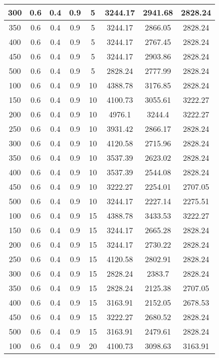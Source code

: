 \documentclass[a4paper, 12pt]{extreport}
\begin{document}
\begin{itemize}
\begin{longtable}{|c|c|c|c|c|c|c|c|}
			300 & 0.6 & 0.4 & 0.9 & 5 & 3244.17 & 2941.68 & 2828.24 \\\hline
			350 & 0.6 & 0.4 & 0.9 & 5 & 3244.17 & 2866.05 & 2828.24 \\\hline
			400 & 0.6 & 0.4 & 0.9 & 5 & 3244.17 & 2767.45 & 2828.24 \\\hline
			450 & 0.6 & 0.4 & 0.9 & 5 & 3244.17 & 2903.86 & 2828.24 \\\hline
			500 & 0.6 & 0.4 & 0.9 & 5 & 2828.24 & 2777.99 & 2828.24 \\\hline
			100 & 0.6 & 0.4 & 0.9 & 10 & 4388.78 & 3176.85 & 2828.24 \\\hline
			150 & 0.6 & 0.4 & 0.9 & 10 & 4100.73 & 3055.61 & 3222.27 \\\hline
			200 & 0.6 & 0.4 & 0.9 & 10 & 4976.1 & 3244.4 & 3222.27 \\\hline
			250 & 0.6 & 0.4 & 0.9 & 10 & 3931.42 & 2866.17 & 2828.24 \\\hline
			300 & 0.6 & 0.4 & 0.9 & 10 & 4120.58 & 2715.96 & 2828.24 \\\hline
			350 & 0.6 & 0.4 & 0.9 & 10 & 3537.39 & 2623.02 & 2828.24 \\\hline
			400 & 0.6 & 0.4 & 0.9 & 10 & 3537.39 & 2544.08 & 2828.24 \\\hline
			450 & 0.6 & 0.4 & 0.9 & 10 & 3222.27 & 2254.01 & 2707.05 \\\hline
			500 & 0.6 & 0.4 & 0.9 & 10 & 3244.17 & 2227.14 & 2275.51 \\\hline
			100 & 0.6 & 0.4 & 0.9 & 15 & 4388.78 & 3433.53 & 3222.27 \\\hline
			150 & 0.6 & 0.4 & 0.9 & 15 & 3244.17 & 2665.28 & 2828.24 \\\hline
			200 & 0.6 & 0.4 & 0.9 & 15 & 3244.17 & 2730.22 & 2828.24 \\\hline
			250 & 0.6 & 0.4 & 0.9 & 15 & 4120.58 & 2802.91 & 2828.24 \\\hline
			300 & 0.6 & 0.4 & 0.9 & 15 & 2828.24 & 2383.7 & 2828.24 \\\hline
			350 & 0.6 & 0.4 & 0.9 & 15 & 2828.24 & 2125.38 & 2707.05 \\\hline
			400 & 0.6 & 0.4 & 0.9 & 15 & 3163.91 & 2152.05 & 2678.53 \\\hline
			450 & 0.6 & 0.4 & 0.9 & 15 & 3222.27 & 2680.52 & 2828.24 \\\hline
			500 & 0.6 & 0.4 & 0.9 & 15 & 3163.91 & 2479.61 & 2828.24 \\\hline
			100 & 0.6 & 0.4 & 0.9 & 20 & 4100.73 & 3098.63 & 3163.91 \\\hline

\end{longtable}
\end{itemize}
\end{document}
